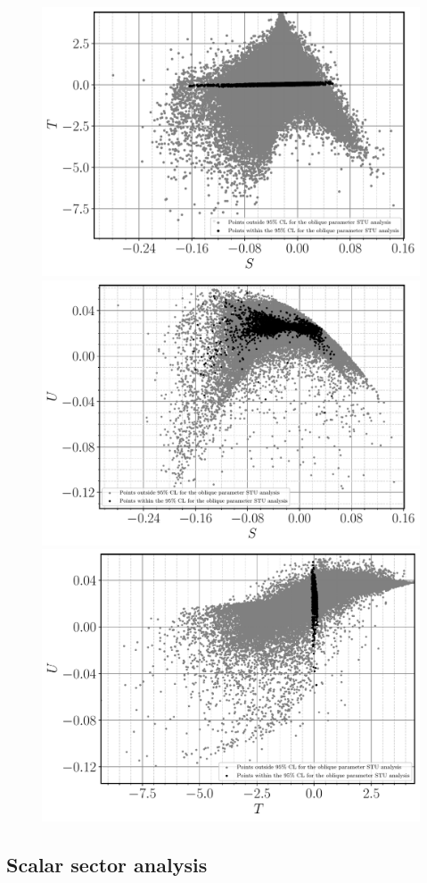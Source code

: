 \begin{figure}[H]
	\centering
	\includegraphics[width=.49\textwidth]{Images/3HDM/EW/EW_S_T_black.pdf}	\includegraphics[width=.49\textwidth]{Images/3HDM/EW/EW_S_U_black.pdf}
	\includegraphics[width=.49\textwidth]{Images/3HDM/EW/EW_T_U_black.pdf}
	\caption{}
	\label{}
\end{figure}	

\subsection{Scalar sector analysis}

